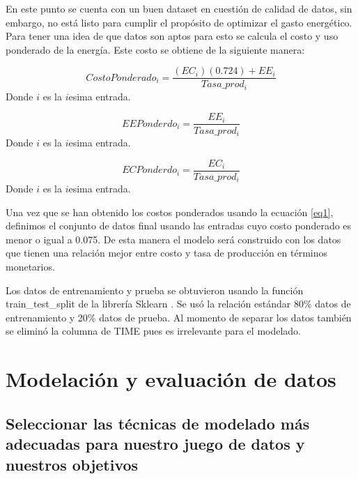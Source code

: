 \documentclass{article}
\begin{document}
En este punto se cuenta con un buen dataset en cuestión de calidad de datos, sin embargo, no está listo para cumplir el propósito de optimizar el gasto energético. Para tener una idea de que datos son aptos para esto  se calcula el costo y uso ponderado de la energía. Este costo se obtiene de la siguiente manera:


\begin{equation}\label{eq1}
    CostoPonderado_{i}=\frac{(EC_{i})(0.724)+EE_{i}}{Tasa\_prod_{i}}
\end{equation}
Donde $i$ es la $i$esima entrada. 

\begin{equation}
    EEPonderdo_{i}=\frac{EE_{i}}{Tasa\_prod_{i}}
\end{equation}
Donde $i$ es la $i$esima entrada. 


\begin{equation}
    ECPonderdo_{i}=\frac{EC_{i}}{Tasa\_prod_{i}}
\end{equation}
Donde $i$ es la $i$esima entrada. 


Una vez que se han obtenido los costos ponderados usando la ecuación \ref{eq1}, definimos el conjunto de datos final usando las entradas cuyo costo ponderado es menor o igual a 0.075. De esta manera el modelo será construido con los datos que tienen una relación mejor entre costo y tasa de producción en términos monetarios.

Los datos de entrenamiento y prueba se obtuvieron usando la función train\_test\_split de la librería Sklearn \cite{scikit-learn}. 
Se usó la relación estándar 80\% datos de entrenamiento y 20\% datos de prueba. Al momento de separar los datos también se eliminó la columna de TIME pues es irrelevante para el modelado.

\section{Modelación y evaluación de datos}

\subsection{Seleccionar las técnicas de modelado más adecuadas para nuestro juego de datos y nuestros objetivos}\label{tecnicas}
\end{document}
